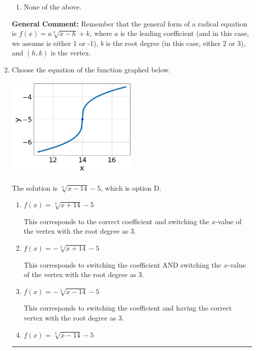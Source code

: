 \documentclass{extbook}[14pt]
\newcommand{\litem}[1]{\item #1

\rule{\textwidth}{0.4pt}}
\begin{document}
\begin{enumerate}
{\begin{enumerate}[label=\Alph*.]
\item None of the above.\end{enumerate}
\textbf{General Comment:} Remember that the general form of a radical equation is $ f(x) = a \sqrt[b]{x - h} + k $, where $a$ is the leading coefficient (and in this case, we assume is either 1 or -1), $b$ is the root degree (in this case, either 2 or 3), and $(h, k)$ is the vertex.
}
\litem{
Choose the equation of the function graphed below.

\begin{center}
    \includegraphics[width=0.5\textwidth]{../Figures/radicalGraphToEquationCopyC.png}
\end{center}



The solution is \( \sqrt[3]{x - 14} - 5 \), which is option D.\begin{enumerate}[label=\Alph*.]
\item \( f(x) = \sqrt[3]{x + 14} - 5 \)

This corresponds to the correct coefficient and switching the $x$-value of the vertex with the root degree as $3$.
\item \( f(x) = - \sqrt[3]{x + 14} - 5 \)

This corresponds to switching the coefficient AND switching the $x$-value of the vertex with the root degree as $3$.
\item \( f(x) = - \sqrt[3]{x - 14} - 5 \)

This corresponds to switching the coefficient and having the correct vertex with the root degree as $3$.
\item \( f(x) = \sqrt[3]{x - 14} - 5 \)


\end{enumerate}}
\end{enumerate}
\end{document}
